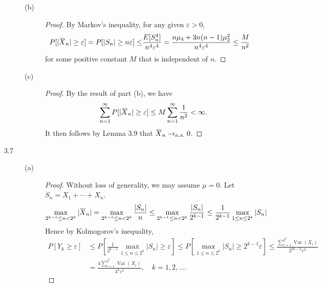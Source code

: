 \documentclass{article}
\newcommand{\eps}{\varepsilon}
\newcommand{\overbar}[1]{\mkern 1.5mu\overline{\mkern-1.5mu#1\mkern-1.5mu}\mkern 1.5mu}
\DeclareMathOperator*{\Var}{Var}
\theoremstyle{definition}
\theoremstyle{plain}
\theoremstyle{remark}
\begin{document}
\begin{description}
\begin{description}
\item[(b)]
\begin{proof}
By Markov's inequality, for any given $\eps > 0$, 
\begin{align*}
P[|\overbar{X}_n| \geq \eps] = P[|S_n| \geq n \eps] \leq & \frac{E[S_n^4]}{n^4\eps^4} = \frac{n\mu_4 + 3n(n - 1)\mu_2^2}{n^4\eps^4} \leq \frac{M}{n^2}
\end{align*}
for some positive constant $M$ that is independent of $n$. 
\end{proof}

\item[(c)]
\begin{proof}
By the result of part (b), we have
$$\sum_{n = 1}^\infty P[|\overbar{X}_n| \geq \eps] \leq M\sum_{n = 1}^\infty \frac{1}{n^2} < \infty.$$
It then follows by Lemma $3.9$ that $\overbar{X}_n \to_{a.s.} 0$. 
\end{proof}
\end{description}
\item[3.7]
\begin{description}
\item[(a)]
\begin{proof}
Without loss of generality, we may assume $\mu = 0$. Let $S_n = X_1 + \cdots + X_n$. 
$$\max_{2^{k - 1} \leq n < 2^k} |\overbar{X}_n| = \max_{2^{k - 1} \leq n < 2^k} \frac{|S_n|}{n} \leq 
 \max_{2^{k - 1} \leq n < 2^k} \frac{|S_n|}{2^{k - 1}} \leq \frac{1}{2^{k - 1}} \max_{1 \leq n \leq 2^k}|S_n|$$
 Hence by Kolmogorov's inequality, 
\begin{align*}
 P[Y_k \geq \eps] & \leq P\left[\frac{1}{2^{k - 1}}\max_{1 \leq n \leq 2^k} |S_n| \geq \eps\right] \leq
 P\left[\max_{1 \leq n \leq 2^k} |S_n| \geq 2^{k - 1} \eps\right] \leq \frac{\sum_{i = 1}^{2^k} \Var(X_i)}{2^{2k - 2}\eps^2} \\
& = \frac{4\sum_{i = 1}^{2^k} \Var(X_i)}{{4^k}\eps^2}, \quad k = 1, 2, \ldots. 
\end{align*}
\end{proof}


\end{description}
\end{description}
\end{document}
